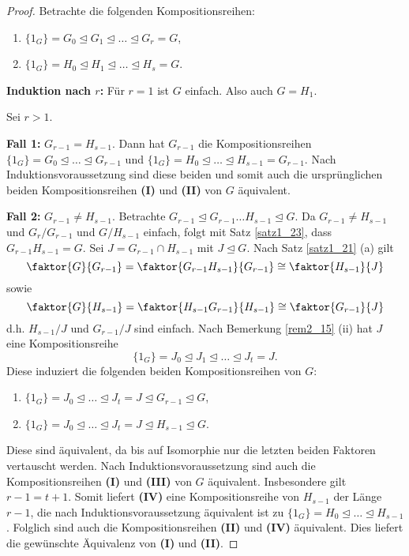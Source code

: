 \begin{proof}
	Betrachte die folgenden Kompositionsreihen:
	\begin{enumerate}[label=(\Roman*)]
		\item $\{1_G\} = G_0 \unlhd G_1 \unlhd \dots \unlhd G_r = G$,
		\item $\{1_G\} = H_0 \unlhd H_1 \unlhd \dots \unlhd H_s = G$.
	\end{enumerate}
	\textbf{Induktion nach $r$: } Für $r = 1$ ist $G$ einfach. Also auch $G = H_1$.
	
	Sei $r > 1$. 
	
	\textbf{Fall 1: } $G_{r-1} = H_{s-1}$. Dann hat $G_{r-1}$ die Kompositionsreihen $\{1_G\} = G_0 \unlhd \dots \unlhd G_{r-1}$ und $\{1_G\} = H_0 \unlhd \dots \unlhd H_{s-1} = G_{r-1}$. Nach Induktionsvoraussetzung sind diese beiden und somit auch die ursprünglichen beiden Kompositionsreihen \textbf{(I)} und \textbf{(II)} von $G$ äquivalent.
	
	\textbf{Fall 2: } $G_{r-1} \neq H_{s-1}$. Betrachte $G_{r-1} \unlhd G_{r-1}\dots H_{s-1} \unlhd G$. Da $G_{r-1} \neq H_{s-1}$ und $G_r / G_{r-1}$ und $G/H_{s-1}$ einfach, folgt mit Satz \ref{satz1_23}, dass $G_{r-1}H_{s-1} = G$. Sei $J = G_{r-1} \cap H_{s-1}$ mit $J \unlhd G$. Nach Satz \ref{satz1_21} (a) gilt
	\[\faktor{G}{G_{r-1}} = \faktor{G_{r-1}H_{s-1}}{G_{r-1}} \cong \faktor{H_{s-1}}{J}\]
	sowie 
	\[\faktor{G}{H_{s-1}} = \faktor{H_{s-1} G_{r-1}}{H_{s-1}} \cong \faktor{G_{r-1}}{J}\]
	d.h. $H_{s-1} / J$ und $G_{r-1}/J$ sind einfach. Nach Bemerkung \ref{rem2_15} (ii) hat $J$ eine Kompositionsreihe
	\[\{1_G\} = J_0 \unlhd J_1 \unlhd \dots \unlhd J_t = J.\]
	Diese induziert die folgenden beiden Kompositionsreihen von $G$:
	\begin{enumerate}[start=3,label=(\Roman*)]
		\item $\{1_G\} = J_0 \unlhd \dots \unlhd J_t = J \unlhd G_{r-1} \unlhd G$,
		\item $\{1_G\} = J_0 \unlhd \dots \unlhd J_t = J \unlhd H_{s-1} \unlhd G$.
	\end{enumerate}
	Diese sind äquivalent, da bis auf Isomorphie nur die letzten beiden Faktoren vertauscht werden. Nach Induktionsvoraussetzung sind auch die Kompositionsreihen \textbf{(I)} und \textbf{(III)} von $G$ äquivalent. Insbesondere gilt $r-1 = t+1$. Somit liefert \textbf{(IV)} eine Kompositionsreihe von $H_{s-1}$ der Länge $r-1$, die nach Induktionsvoraussetzung äquivalent ist zu $\{1_G\} = H_0 \unlhd \dots \unlhd H_{s-1}$. Folglich sind auch die Kompositionsreihen \textbf{(II)} und \textbf{(IV)} äquivalent. Dies liefert die gewünschte Äquivalenz von \textbf{(I)} und \textbf{(II)}.
\end{proof}
